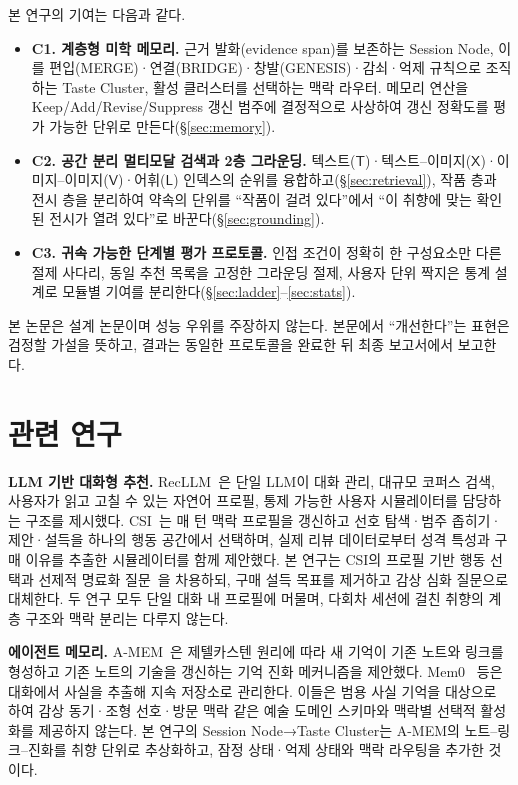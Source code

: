 \documentclass[10pt,twocolumn,letterpaper]{article}
\newcommand{\sT}{\mathsf{T}}
\newcommand{\sX}{\mathsf{X}}
\newcommand{\sV}{\mathsf{V}}
\newcommand{\sL}{\mathsf{L}}
\begin{document}
본 연구의 기여는 다음과 같다.
\begin{itemize}
\item \textbf{C1. 계층형 미학 메모리.} 근거 발화(evidence span)를 보존하는 Session Node, 이를 편입(MERGE)·연결(BRIDGE)·창발(GENESIS)·감쇠·억제 규칙으로 조직하는 Taste Cluster, 활성 클러스터를 선택하는 맥락 라우터. 메모리 연산을 Keep/Add/Revise/Suppress 갱신 범주에 결정적으로 사상하여 갱신 정확도를 평가 가능한 단위로 만든다(§\ref{sec:memory}).
\item \textbf{C2. 공간 분리 멀티모달 검색과 2층 그라운딩.} 텍스트($\sT$)·텍스트–이미지($\sX$)·이미지–이미지($\sV$)·어휘($\sL$) 인덱스의 순위를 융합하고(§\ref{sec:retrieval}), 작품 층과 전시 층을 분리하여 약속의 단위를 ``작품이 걸려 있다''에서 ``이 취향에 맞는 확인된 전시가 열려 있다''로 바꾼다(§\ref{sec:grounding}).
\item \textbf{C3. 귀속 가능한 단계별 평가 프로토콜.} 인접 조건이 정확히 한 구성요소만 다른 절제 사다리, 동일 추천 목록을 고정한 그라운딩 절제, 사용자 단위 짝지은 통계 설계로 모듈별 기여를 분리한다(§\ref{sec:ladder}–\ref{sec:stats}).
\end{itemize}
본 논문은 설계 논문이며 성능 우위를 주장하지 않는다. 본문에서 ``개선한다''는 표현은 검정할 가설을 뜻하고, 결과는 동일한 프로토콜을 완료한 뒤 최종 보고서에서 보고한다.

\section{관련 연구}

\textbf{LLM 기반 대화형 추천.} RecLLM~\cite{friedman2023recllm}은 단일 LLM이 대화 관리, 대규모 코퍼스 검색, 사용자가 읽고 고칠 수 있는 자연어 프로필, 통제 가능한 사용자 시뮬레이터를 담당하는 구조를 제시했다. CSI~\cite{kim2025csi}는 매 턴 맥락 프로필을 갱신하고 선호 탐색·범주 좁히기·제안·설득을 하나의 행동 공간에서 선택하며, 실제 리뷰 데이터로부터 성격 특성과 구매 이유를 추출한 시뮬레이터를 함께 제안했다. 본 연구는 CSI의 프로필 기반 행동 선택과 선제적 명료화 질문~\cite{aliannejadi2019asking}을 차용하되, 구매 설득 목표를 제거하고 감상 심화 질문으로 대체한다. 두 연구 모두 단일 대화 내 프로필에 머물며, 다회차 세션에 걸친 취향의 계층 구조와 맥락 분리는 다루지 않는다.

\textbf{에이전트 메모리.} A-MEM~\cite{xu2025amem}은 제텔카스텐 원리에 따라 새 기억이 기존 노트와 링크를 형성하고 기존 노트의 기술을 갱신하는 기억 진화 메커니즘을 제안했다. Mem0~\cite{chhikara2025mem0} 등은 대화에서 사실을 추출해 지속 저장소로 관리한다. 이들은 범용 사실 기억을 대상으로 하여 감상 동기·조형 선호·방문 맥락 같은 예술 도메인 스키마와 맥락별 선택적 활성화를 제공하지 않는다. 본 연구의 Session Node→Taste Cluster는 A-MEM의 노트–링크–진화를 취향 단위로 추상화하고, 잠정 상태·억제 상태와 맥락 라우팅을 추가한 것이다.
\end{document}
